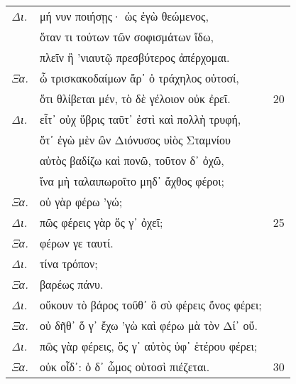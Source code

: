 \documentclass[13pt]{article}
\begin{document}
\begin{greek}
\begin{multicols}{2}
\begin{parcolumns}[colwidths={1=1.5em, 2=0.9\linewidth}]{2}
\end{parcolumns}
\end{multicols}

\newpage

\begin{spacing}{1.5}

\begin{tabularx}{\textwidth}{@{}lXr@{}}
  \textit{Δι.} & μή νυν ποιήσῃς· ὡς ἐγὼ θεώμενος, & \\
  & ὅταν τι τούτων τῶν σοφισμάτων ἴδω, & \\
  & πλεῖν ἢ 'νιαυτῷ πρεσβύτερος ἀπέρχομαι. & \\
  \textit{Ξα.} & ὦ τρισκακοδαίμων ἄρ᾽ ὁ τράχηλος οὑτοσί, & \\
  & ὅτι θλίβεται μέν, τὸ δὲ γέλοιον οὐκ ἐρεῖ. & 20 \\
  \textit{Δι.} & εἶτ᾽ οὐχ ὕβρις ταῦτ᾽ ἐστὶ καὶ πολλὴ τρυφή, & \\
  & ὅτ᾽ ἐγὼ μὲν ὢν Διόνυσος υἱὸς Σταμνίου & \\
  & αὐτὸς βαδίζω καὶ πονῶ, τοῦτον δ᾽ ὀχῶ, & \\ 
  & ἵνα μὴ ταλαιπωροῖτο μηδ᾽ ἄχθος φέροι; & \\
  \textit{Ξα.} & οὐ γὰρ φέρω 'γώ; & \\
  \textit{Δι.} & \hspace*{7.5em}πῶς φέρεις γὰρ ὅς γ᾽ ὀχεῖ; & 25 \\
  \textit{Ξα.} & φέρων γε ταυτί. & \\
  \textit{Δι.} & \hspace*{6.5em}τίνα τρόπον; & \\
  \textit{Ξα.} & \hspace*{12em}βαρέως πάνυ. & \\
  \textit{Δι.} & οὔκουν τὸ βάρος τοῦθ᾽ ὃ σὺ φέρεις ὄνος φέρει; & \\
  \textit{Ξα.} & οὐ δῆθ᾽ ὅ γ᾽ ἔχω 'γὼ καὶ φέρω μὰ τὸν Δί᾽ οὔ. & \\
  \textit{Δι.} & πῶς γὰρ φέρεις, ὅς γ᾽ αὐτὸς ὑφ᾽ ἑτέρου φέρει; & \\
  \textit{Ξα.} & οὐκ οἶδ᾽: ὁ δ᾽ ὦμος οὑτοσὶ πιέζεται. & 30 \\  
\end{tabularx}

\end{spacing}

\newpage


\end{greek}
\end{document}
